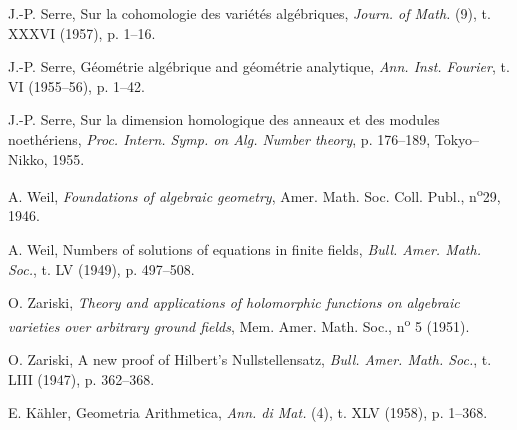 \begin{thebibliography}{22}
J.-P. Serre,
Sur la cohomologie des vari\'et\'es alg\'ebriques,
\emph{Journ. of Math.} (9),
t. XXXVI (1957),
p. 1--16.

J.-P. Serre,
G\'eom\'etrie alg\'ebrique and g\'eom\'etrie analytique,
\emph{Ann. Inst. Fourier},
t. VI (1955--56),
p. 1--42.

J.-P. Serre,
Sur la dimension homologique des anneaux et des modules noeth\'eriens,
\emph{Proc. Intern. Symp. on Alg. Number theory},
p. 176--189,
Tokyo--Nikko,
1955.

A. Weil,
\emph{Foundations of algebraic geometry},
Amer. Math. Soc. Coll. Publ.,
n\textsuperscript{o}29,
1946.

A. Weil,
Numbers of solutions of equations in finite fields,
\emph{Bull. Amer. Math. Soc.},
t. LV (1949),
p. 497--508.

O. Zariski,
\emph{Theory and applications of holomorphic functions on algebraic varieties over arbitrary ground fields},
Mem. Amer. Math. Soc.,
n\textsuperscript{o} 5 (1951).

O. Zariski,
A new proof of Hilbert's Nullstellensatz,
\emph{Bull. Amer. Math. Soc.},
t. LIII (1947),
p. 362--368.

E. K\"ahler,
Geometria Arithmetica,
\emph{Ann. di Mat.} (4),
t. XLV (1958),
p. 1--368.

\end{thebibliography}

